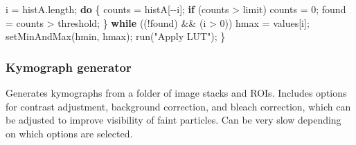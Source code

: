 \documentclass[
  12pt,
  a4paper,
]{book}
\newenvironment{Shaded}{}{}
\newcommand{\ControlFlowTok}[1]{\textcolor[rgb]{0.00,0.44,0.13}{\textbf{#1}}}
\newcommand{\DecValTok}[1]{\textcolor[rgb]{0.25,0.63,0.44}{#1}}
\newcommand{\NormalTok}[1]{#1}
\newcommand{\OperatorTok}[1]{\textcolor[rgb]{0.40,0.40,0.40}{#1}}
\newcommand{\StringTok}[1]{\textcolor[rgb]{0.25,0.44,0.63}{#1}}
\begin{document}
\begin{Shaded}
\begin{Highlighting}[]
\NormalTok{    i }\OperatorTok{=}\NormalTok{ histA}\OperatorTok{.}\NormalTok{length}\OperatorTok{;} 
    \ControlFlowTok{do} \OperatorTok{\{} 
\NormalTok{            counts }\OperatorTok{=}\NormalTok{ histA}\OperatorTok{[{-}{-}}\NormalTok{i}\OperatorTok{];} 
            \ControlFlowTok{if} \OperatorTok{(}\NormalTok{counts }\OperatorTok{\textgreater{}}\NormalTok{ limit}\OperatorTok{)}\NormalTok{ counts }\OperatorTok{=} \DecValTok{0}\OperatorTok{;} 
\NormalTok{            found }\OperatorTok{=}\NormalTok{ counts }\OperatorTok{\textgreater{}}\NormalTok{ threshold}\OperatorTok{;} 
    \OperatorTok{\}} \ControlFlowTok{while} \OperatorTok{((!}\NormalTok{found}\OperatorTok{)} \OperatorTok{\&\&} \OperatorTok{(}\NormalTok{i }\OperatorTok{\textgreater{}} \DecValTok{0}\OperatorTok{))} 
\NormalTok{    hmax }\OperatorTok{=}\NormalTok{ values}\OperatorTok{[}\NormalTok{i}\OperatorTok{];} 
\NormalTok{    setMinAndMax}\OperatorTok{(}\NormalTok{hmin}\OperatorTok{,}\NormalTok{ hmax}\OperatorTok{);} 
\NormalTok{    run}\OperatorTok{(}\StringTok{"Apply LUT"}\OperatorTok{);} 
\OperatorTok{\}}
\end{Highlighting}
\end{Shaded}

\hypertarget{kymograph-generator}{%
\subsubsection{Kymograph generator}\label{kymograph-generator}}

Generates kymographs from a folder of image stacks and ROIs. Includes options for contrast adjustment, background correction, and bleach correction, which can be adjusted to improve visibility of faint particles. Can be very slow depending on which options are selected.
\end{document}
